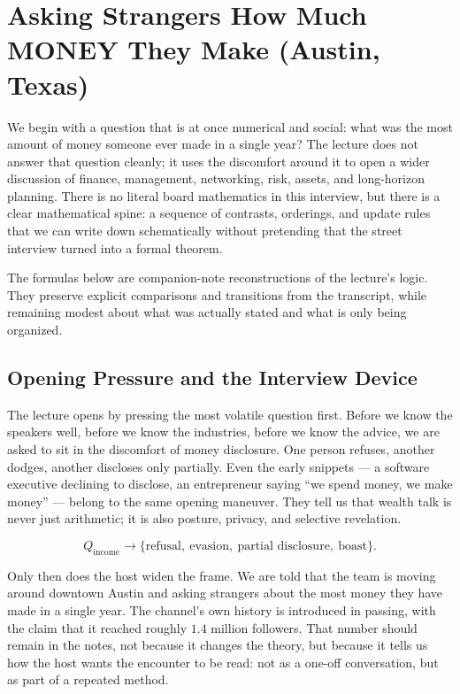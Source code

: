 \chapter{Asking Strangers How Much MONEY They Make (Austin, Texas)}

We begin with a question that is at once numerical and social: what was the most amount of money someone ever made in a single year? The lecture does not answer that question cleanly; it uses the discomfort around it to open a wider discussion of finance, management, networking, risk, assets, and long-horizon planning. There is no literal board mathematics in this interview, but there is a clear mathematical spine: a sequence of contrasts, orderings, and update rules that we can write down schematically without pretending that the street interview turned into a formal theorem.

\begin{remark}
The formulas below are companion-note reconstructions of the lecture's logic. They preserve explicit comparisons and transitions from the transcript, while remaining modest about what was actually stated and what is only being organized.
\end{remark}

\section{Opening Pressure and the Interview Device}

The lecture opens by pressing the most volatile question first. Before we know the speakers well, before we know the industries, before we know the advice, we are asked to sit in the discomfort of money disclosure. One person refuses, another dodges, another discloses only partially. Even the early snippets --- a software executive declining to disclose, an entrepreneur saying ``we spend money, we make money'' --- belong to the same opening maneuver. They tell us that wealth talk is never just arithmetic; it is also posture, privacy, and selective revelation.

\begin{equation}
Q_{\mathrm{income}} \longrightarrow \{\text{refusal},\ \text{evasion},\ \text{partial disclosure},\ \text{boast}\}.
\end{equation}

Only then does the host widen the frame. We are told that the team is moving around downtown Austin and asking strangers about the most money they have made in a single year. The channel's own history is introduced in passing, with the claim that it reached roughly \(1.4\) million followers. That number should remain in the notes, not because it changes the theory, but because it tells us how the host wants the encounter to be read: not as a one-off conversation, but as part of a repeated method.

